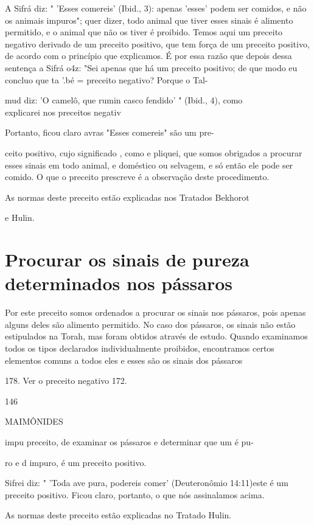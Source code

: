 \begin{itemize}
\begin{enumrate}
\begin{itemize}
\begin{itemize}
\begin{itemize}
A Sifrá diz: " 'Esses comereis' (Ibid., 3): apenas 'esses' podem ser
co­midos, e não os animais impuros"; quer dizer, todo animal que tiver
esses si­nais é alimento permitido, e o animal que não os tiver é
proibido. Temos aqui um preceito negativo derivado de um preceito
positivo, que tem força de um preceito positivo, de acordo com o
princípio que explicamos. É por essa razão que depois dessa sentença a
Sifrá o4z: "Sei apenas que há um preceito positivo; de que modo eu
concluo que ta '.bé = preceito negativo? Porque o Tal-

mud diz: 'O camelô, que rumin casco fendido' " (Ibid., 4), como\\
explicarei nos preceitos negativ

Portanto, ficou claro avras "Esses comereis" são um pre-

ceito positivo, cujo significado , como e pliquei, que somos obrigados a
pro­curar esses sinais em todo animal, e doméstico ou selvagem, e só
então ele pode ser comido. O que o preceito prescreve é a observação
deste pro­cedimento.


As normas deste preceito estão explicadas nos Tratados Bekhorot


e Hulin.

\section{Procurar os sinais de pureza determinados nos pássaros}

Por este preceito somos ordenados a procurar os sinais nos pássa­ros,
pois apenas alguns deles são alimento permitido. No caso dos pássaros,
os sinais não estão estipulados na Torah, mas foram obtidos através de
estudo. Quan­do examinamos todos os tipos declarados individualmente
proibidos, encon­tramos certos elementos comuns a todos eles e esses são
os sinais dos pássaros

178. Ver o preceito negativo 172.


146

MAIMÔNIDES


impu preceito, de examinar os pássaros e determinar que um é pu-

ro e d impuro, é um preceito positivo.

Sifrei diz: " 'Toda ave pura, podereis comer' (Deuteronômio 14:11)este é
um preceito positivo. Ficou claro, portanto, o que nós assinala­mos
acima.

As normas deste preceito estão explicadas no Tratado Hulin.


\end{itemize}
\end{itemize}
\end{itemize}
\end{enumrate}
\end{itemize}
